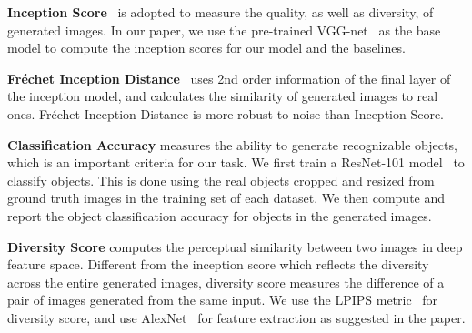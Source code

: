 \documentclass[10pt,twocolumn,letterpaper]{article}
\begin{document}
\vspace{0.05in}
\noindent\textbf{Inception Score}~\cite{salimans2016improved} is adopted to measure the quality, as well as diversity, of generated images. 
In our paper, we use the pre-trained VGG-net~\cite{simonyan2014very} as the base model to compute the inception scores for our model and the baselines.


\vspace{0.05in}
\noindent\textbf{Fr\'echet Inception Distance}~\cite{Heusel2017} uses 2nd order information of the final layer of the inception model, and calculates the similarity of generated images to real ones. Fr\'echet Inception Distance is more robust to noise than Inception Score.

\vspace{0.05in}
\noindent\textbf{Classification Accuracy} measures the ability to generate recognizable objects, which is an important criteria for our task.
We first train a ResNet-101 model~\cite{He2016} to classify objects. This is done using the real objects cropped and resized from ground truth images in the training set of each dataset. We then compute and report the object classification accuracy for objects in the generated images.

\vspace{0.05in}
\noindent\textbf{Diversity Score} computes the perceptual similarity between two images in deep feature space. 
Different from the inception score which reflects the diversity across the entire generated images, diversity score measures the difference of a pair of images generated from the same input. 
We use the LPIPS metric~\cite{zhang2018unreasonable} for diversity score, and use AlexNet~\cite{krizhevsky2012imagenet} for feature extraction as suggested in the paper.
\end{document}
